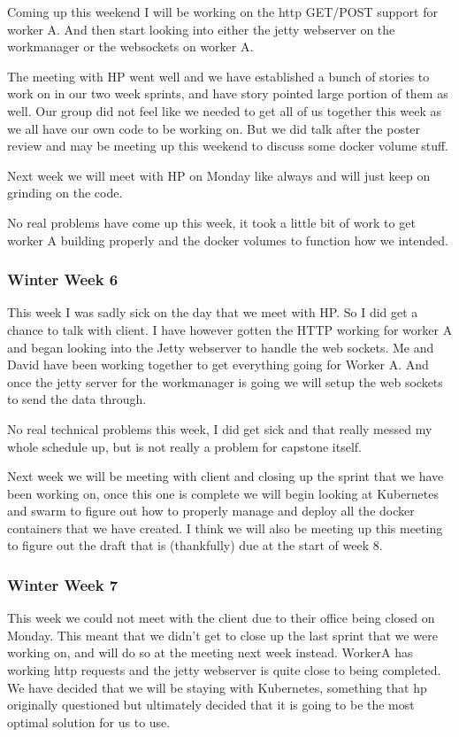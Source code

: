 \documentclass[onecolumn, draftclsnofoot,10pt, compsoc]{IEEEtran}
\begin{document}
Coming up this weekend I will be working on the http GET/POST support for worker A. And then start looking into either the jetty webserver on the workmanager or the websockets on worker A.

The meeting with HP went well and we have established a bunch of stories to work on in our two week sprints, and have story pointed large portion of them as well. Our group did not feel like we needed to get all of us together this week as we all have our own code to be working on. But we did talk after the poster review and may be meeting up this weekend to discuss some docker volume stuff.

Next week we will meet with HP on Monday like always and will just keep on grinding on the code.

No real problems have come up this week, it took a little bit of work to get worker A building properly and the docker volumes to function how we intended.

\subsubsection*{Winter Week 6}
This week I was sadly sick on the day that we meet with HP. So I did get a chance to talk with client. I have however gotten the HTTP working for worker A and began looking into the Jetty webserver to handle the web sockets. Me and David have been working together to get everything going for Worker A. And once the jetty server for the workmanager is going we will setup the web sockets to send the data through.

No real technical problems this week, I did get sick and that really messed my whole schedule up, but is not really a problem for capstone itself.

Next week we will be meeting with client and closing up the sprint that we have been working on, once this one is complete we will begin looking at Kubernetes and swarm to figure out how to properly manage and deploy all the docker containers that we have created. I think we will also be meeting up this meeting to figure out the draft that is (thankfully) due at the start of week 8.

\subsubsection*{Winter Week 7}
This week we could not meet with the client due to their office being closed on Monday. This meant that we didn't get to close up the last sprint that we were working on, and will do so at the meeting next week instead. WorkerA has working http requests and the jetty webserver is quite close to being completed. We have decided that we will be staying with Kubernetes, something that hp originally questioned but ultimately decided that it is going to be the most optimal solution for us to use.
\end{document}
